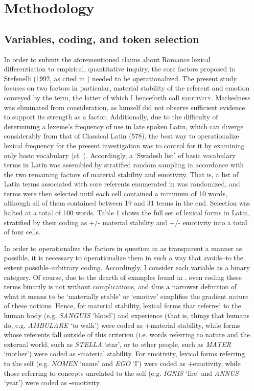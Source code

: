 \documentclass[output=paper,colorlinks,citecolor=brown,
]{langscibook}
\begin{document}
\section{Methodology}
\subsection{Variables, coding, and token selection}
In order to submit the aforementioned claims about Romance lexical differentiation to empirical, quantitative inquiry, the core factors proposed in Stefenelli (1992, as cited in \citealt{stefenelli_lexical_2011}) needed to be operationalized. The present study focuses on two factors in particular, material stability of the referent and emotion conveyed by the term, the latter of which I henceforth call \textsc{emotivity}. Markedness was eliminated from consideration, as \citet[580]{stefenelli_lexical_2011} himself did not observe sufficient evidence to support its strength as a factor. Additionally, due to the difficulty of determining a lexeme’s frequency of use in late spoken Latin, which can diverge considerably from that of Classical Latin (578), the best way to operationalize lexical frequency for the present investigation was to control for it by examining only basic vocabulary (cf. \citealt{swadesh_towards_1955}). Accordingly, a ‘Swadesh list’ of basic vocabulary terms in Latin was assembled by stratified random sampling in accordance with the two remaining factors of material stability and emotivity. That is, a list of Latin terms associated with core referents enumerated in \citet{swadesh_towards_1955} was randomized, and terms were then selected until each cell contained a minimum of 10 words, although all of them contained between 19 and 31 terms in the end. Selection was halted at a total of 100 words. Table 1 shows the full set of lexical forms in Latin, stratified by their coding as +/- material stability and +/- emotivity into a total of four cells.  

In order to operationalize the factors in question in as transparent a manner as possible, it is necessary to operationalize them in such a way that avoids–to the extent possible–arbitrary coding. Accordingly, I consider each variable as a binary category. Of course, due to the dearth of examples found in \citet{stefenelli_lexical_2011}, even coding these terms binarily is not without complications, and thus a narrower definition of what it means to be ‘materially stable’ or ‘emotive’ simplifies the gradient nature of these notions. Hence, for material stability, lexical forms that referred to the human body (e.g. \textit{SANGUIS} ‘blood’) and experience (that is, things that humans do, e.g. \textit{AMBULARE} ‘to walk’) were coded as +material stability, while forms whose referents fall outside of this criterion (i.e. words referring to nature and the external world, such as \textit{STELLA} ‘star’, or to other people, such as \textit{MATER} ‘mother’) were coded as -material stability. For emotivity, lexical forms referring to the self (e.g. \textit{NOMEN} ‘name’ and \textit{EGO} ‘I’) were coded as +emotivity, while those referring to concepts unrelated to the self (e.g. \textit{IGNIS} ‘fire’ and \textit{ANNUS} ‘year’) were coded as -emotivity.
\end{document}
